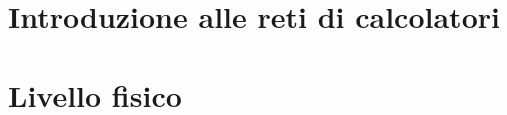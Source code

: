 \documentclass[10pt]{article}
\begin{document}
    \section{Introduzione alle reti di calcolatori}
    

    \section{Livello fisico}
    
\end{document}
